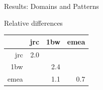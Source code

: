\begin{frame}{Results: Domains and Patterns}
{        \begin{block}{Relative differences}
            \begin{tabular}{rrrr}
                    & jrc & 1bw & emea \\ \hline
                jrc & 2.0 & \cellcolor{green!25}{-2.8} & \cellcolor{green!25}{-2.3} \\
                1bw & \cellcolor{green!25}{-2.2} & 2.4 & \cellcolor{green!25}{-2.6} \\
                emea& \cellcolor{green!25}{-3.2} & 1.1 & 0.7
            \end{tabular}
        \end{block}
    }
\end{frame}
\note[itemize]{
}


